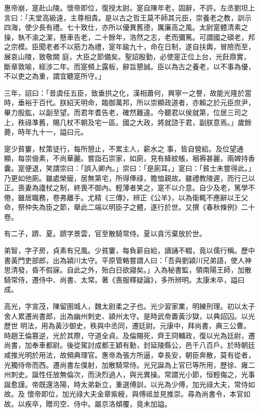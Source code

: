 \begin{pinyinscope}
 惠帝崩，寔赴山陵。懷帝即位，復授太尉。寔自陳年老，固辭，不許。左丞劉坦上言曰：「夫堂高級遠，主尊相貴。是以古之哲王莫不師其元臣，崇養老之教，訓示四海，使少長有禮。七十致仕，亦所以優異舊德，厲廉高之風。太尉寔體清素之操，執不渝之潔，懸車告老，二十餘年，浩然之志，老而彌篤。可謂國之碩老，邦之宗模。臣聞老者不以筋力為禮，寔年踰九十，命在日制，遂自扶輿，冒險而至，展哀山陵，致敬闕
 庭，大臣之節備矣。聖詔殷勤，必使寔正位上台，光飪鼎實，斷章敦喻，經涉二年。而寔頻上露板，辭旨懇誠。臣以為古之養老，以不事為優，不以吏之為重，謂宜聽寔所守。」



 三年，詔曰：「昔虞任五臣，致垂拱之化，漢相蕭何，興寧一之譽，故能光隆於當時，垂裕于百代。朕紹天明命，臨御萬邦，所以崇顯政道者，亦賴之於元臣庶尹，畢力股肱，以副至望。而君年耆告老，確然難違。今聽君以侯就第，位居三司之上，秩祿準舊，賜几杖不朝及宅一區。國之大政，將就諮于君，副朕意焉。」歲餘薨，時年九十一，謚曰元。



 寔少貧窶，杖策徒行，每所憩止，不累主人，薪水之
 事，皆自營給。及位望通顯，每崇儉素，不尚華麗。嘗詣石崇家，如廁，見有絳紋帳，裀褥甚麗，兩婢持香囊。寔便退，笑謂崇曰：「誤入卿內。」崇曰：「是廁耳。」寔曰：「貧士未嘗得此。」乃更如他廁。雖處榮寵，居無第宅，所得俸祿，贍恤親故。雖禮教陵遲，而行己以正。喪妻為廬杖之制，終喪不御內。輕薄者笑之，寔不以介意。自少及老，篤學不倦，雖居職務，卷弗離手。尤精《三傳》，辨正《公羊》，以為衛輒不應辭以王父命，祭仲失為臣之節，舉此二端以明臣子之體，遂行於世。又撰《春秋條例》二十卷。



 有二子，躋、夏。躋字景雲，官至散騎常侍。夏以貪污棄放於世。



 弟智，字子房，貞素有兄風。少貧窶，每負薪自給，讀誦不輟，竟以儒行稱。歷中書黃門吏部郎，出為潁川太守。平原管輅嘗謂人曰：「吾與劉潁川兄弟語，使人神思清發，昏不假寐。自此之外，殆白日欲寢矣。」入為秘書監，領南陽王師，加散騎常侍，遷侍中、尚書、太常。著《喪服釋疑論》，多所辨明。太康末卒，謚曰成。



 高光，字宣茂，陳留圉城人，魏太尉柔之子也。光少習家業，明練刑理。初以太子舍人累遷尚書郎，出為幽州刺史、潁州太守。是時武帝置黃沙獄，以典詔囚。以光歷世
 明法，用為黃沙御史，秩與中丞同，遷廷尉。元康中，拜尚書，典三公曹。時趙王倫篡逆，光於其際，守道全貞。及倫賜死，齊王冏輔政，復以光為廷尉，遷尚書，加奉車都尉。後從駕討成都王穎有勳，封延陵縣公，邑千八百戶。於時朝廷咸推光明於用法，故頻典理官。惠帝為張方所逼，幸長安，朝臣奔散，莫有從者，光獨侍帝而西。遷尚書左僕射，加散騎常侍。光兄誕為上官巳等所用，歷徐、雍二州刺史。誕性任放無倫次，而決烈過人，與光異操。常謂光小節，恒輕侮之，光事誕愈謹。帝既還洛陽，時太弟新立，重選傅訓，以光為少傅，加光祿大夫，常侍如故。及
 懷帝即位，加光祿大夫金章紫綬，與傅祗並見推崇。尋為尚書令，本官如故。以疾卒，贈司空、侍中。屬京洛傾覆，竟未加謚。




\end{pinyinscope}
